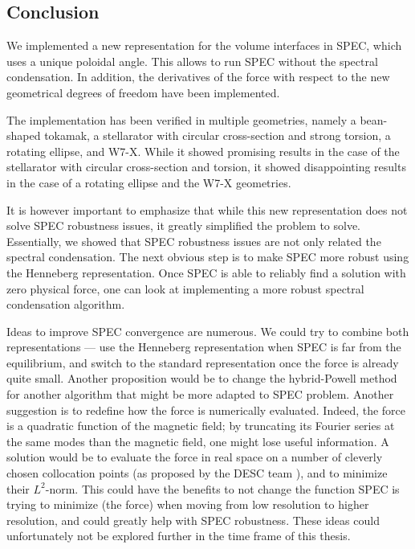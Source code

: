 \documentclass[my_thesis.tex]{subfiles}
\begin{document}
\subsection{Conclusion}

We implemented a new representation for the volume interfaces in SPEC, which uses a unique poloidal angle. This allows to run SPEC without the spectral condensation. In addition, the derivatives of the force with respect to the new geometrical degrees of freedom have been implemented.

The implementation has been verified in multiple geometries, namely a bean-shaped tokamak, a stellarator with circular cross-section and strong torsion, a rotating ellipse, and W7-X. While it showed promising results in the case of the stellarator with circular cross-section and torsion, it showed disappointing results in the case of a rotating ellipse and the W7-X geometries.

It is however important to emphasize that while this new representation does not solve SPEC robustness issues, it greatly simplified the problem to solve. Essentially, we showed that SPEC robustness issues are not only related the spectral condensation. The next obvious step is to make SPEC more robust using the Henneberg representation. Once SPEC is able to reliably find a solution with zero physical force, one can look at implementing a more robust spectral condensation algorithm.

Ideas to improve SPEC convergence are numerous. We could try to combine both representations --- use the Henneberg representation when SPEC is far from the equilibrium, and switch to the standard representation once the force is already quite small. Another proposition would be to change the hybrid-Powell method for another algorithm that might be more adapted to SPEC problem. Another suggestion is to redefine how the force is numerically evaluated. Indeed, the force is a quadratic function of the magnetic field; by truncating its Fourier series at the same modes than the magnetic field, one might lose useful information. A solution would be to evaluate the force in real space on a number of cleverly chosen collocation points (as proposed by the DESC team \citep{Dudt2020}), and to minimize their $L^2$-norm. This could have the benefits to not change the function SPEC is trying to minimize (the force) when moving from low resolution to higher resolution, and could greatly help with SPEC robustness. These ideas could unfortunately not be explored further in the time frame of this thesis.




\end{document}
